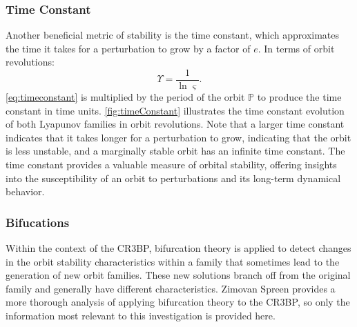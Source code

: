 \subsubsection{Time Constant}
Another beneficial metric of stability is the time constant, which approximates the time it takes
for a perturbation to grow by a factor of $e$. In terms of orbit revolutions:
\begin{equation}
    \Upsilon=\frac{1}{\ln\varsigma}.
    \label{eq:timeconstant}
\end{equation}
\cref{eq:timeconstant} is multiplied by the period of the orbit $\mathbb{P}$ to produce the time
constant in time units. \cref{fig:timeConstant} illustrates the time constant evolution of both
Lyapunov families in orbit revolutions. Note that a larger time constant indicates that it takes
longer for a perturbation to grow, indicating that the orbit is less unstable, and a marginally
stable orbit has an infinite time constant. The time constant provides a valuable measure of
orbital stability, offering insights into the susceptibility of an orbit to perturbations and its
long-term dynamical behavior.

\subsubsection{Bifucations}
Within the context of the CR3BP, bifurcation theory is applied to detect changes in the orbit
stability characteristics within a family that sometimes lead to the generation of new orbit
families. These new solutions branch off from the original family and generally have different
characteristics. Zimovan Spreen provides a more thorough analysis of applying bifurcation theory to
the CR3BP, so only the information most relevant to this investigation is provided
here\cite{ZimovanSpreen:2021}.

